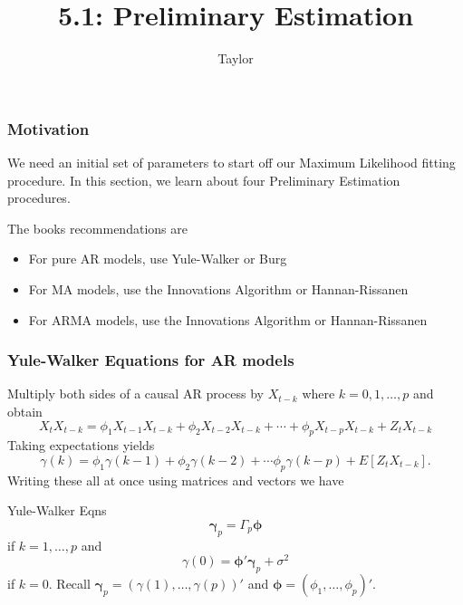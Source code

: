 \documentclass{beamer}
\title["5.1"]{5.1: Preliminary Estimation}
\author{Taylor}
\institute[UVA] 
{
University of Virginia \\
\medskip
\textit{} 
}
\date{}
\begin{document}

\begin{frame}
\titlepage 
\end{frame}

\begin{frame}
\frametitle{Motivation}

We need an initial set of parameters to start off our Maximum Likelihood fitting procedure. In this section, we learn about four Preliminary Estimation procedures.
\newline

The books recommendations are
\begin{itemize}
\item For pure AR models, use Yule-Walker or Burg 
\item For MA models, use the Innovations Algorithm or Hannan-Rissanen 
\item For ARMA models, use the Innovations Algorithm or Hannan-Rissanen
\end{itemize}



\end{frame}


\begin{frame}
\frametitle{Yule-Walker Equations for AR models}

Multiply both sides of a causal AR process by $X_{t-k}$ where $k=0,1,\ldots, p$ and obtain
\[
X_t X_{t-k} = \phi_1 X_{t-1} X_{t-k} + \phi_2 X_{t-2} X_{t-k} + \cdots + \phi_pX_{t-p}X_{t-k} + Z_t X_{t-k}
\]
Taking expectations yields
\[
\gamma(k) = \phi_1 \gamma(k-1) + \phi_2 \gamma(k-2) + \cdots \phi_p \gamma(k-p) + E[Z_t X_{t-k}].
\]
Writing these all at once using matrices and vectors we have
\begin{block}{Yule-Walker Eqns}
\[
\bm{\gamma}_p = \Gamma_p \bm{\phi}
\]
if $k=1,\ldots,p$ and 
\[
\gamma(0) = \bm{\phi}'\bm{\gamma}_p + \sigma^2
\]
if $k=0$. Recall $\bm{\gamma}_p = (\gamma(1),\ldots,\gamma(p))'$ and $\bm{\phi} = (\phi_1, \ldots, \phi_p)'$.
\end{block}
\end{frame}


\end{document}
